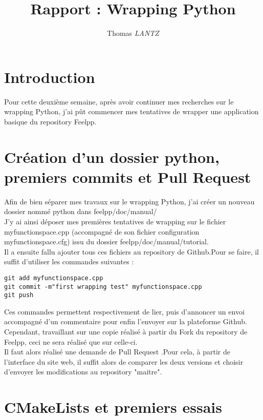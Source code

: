 \documentclass[12pt]{article}
\title {Rapport : Wrapping Python}
\author {Thomas \emph{LANTZ}}
\begin{document}
\maketitle 

\section{Introduction}

Pour cette deuxième semaine, après avoir continuer mes recherches sur le wrapping Python, j'ai  pût commencer mes tentatives de wrapper une application basique du repository Feelpp.

\section{Création d'un dossier python, premiers commits et Pull Request}

Afin de bien séparer mes travaux sur le wrapping Python, j'ai créer un nouveau dossier nommé python dans feelpp/doc/manual/ \\

J'y ai ainsi déposer mes premières tentatives de wrapping sur le fichier myfunctionspace.cpp (accompagné de son fichier configuration myfunctionspace.cfg) issu du dossier feelpp/doc/manual/tutorial. \\

Il a ensuite fallu ajouter tous ces fichiers au repository de Github.Pour se faire, il suffit d'utiliser les commandes suivantes : \\

\begin{lstlisting}
git add myfunctionspace.cpp
git commit -m"first wrapping test" myfunctionspace.cpp
git push
\end{lstlisting}

Ces commandes permettent respectivement de lier, puis d'annoncer un envoi accompagné d'un commentaire pour enfin l'envoyer sur la plateforme Github.\\
Cependant, travaillant sur une copie réalisé à partir du Fork du repository de Feelpp, ceci ne sera réalisé que sur celle-ci. \\

Il faut alors réalisé une demande de Pull Request .Pour cela, à partir de l'interface du site web, il suffit alors de comparer les deux versions et choisir d'envoyer les modifications au repository "maitre".

\section{CMakeLists et premiers essais }
\end{document}
